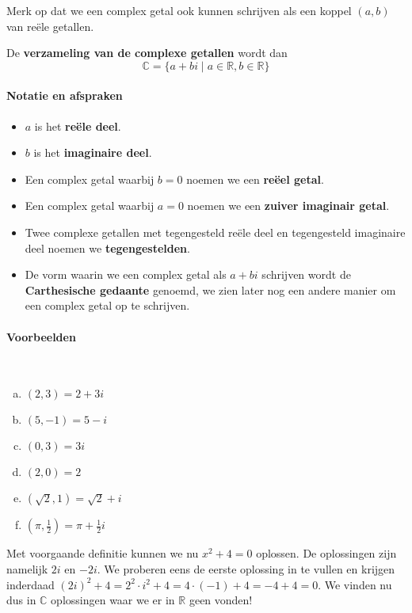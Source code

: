 \documentclass[12pt,twoside]{article}
\begin{document}
Merk op dat we een complex getal ook kunnen schrijven als een koppel $(a,b)$ van reële getallen.

De {\bf verzameling van de complexe getallen} wordt dan
$$\mathbb{C}=\{ a + bi \;|\; a\in\mathbb{R}, b\in\mathbb{R}\}$$

\paragraph*{Notatie en afspraken}
\begin{itemize}
  \item $a$ is het {\bf reële deel}.
  \item $b$ is het {\bf imaginaire deel}.
  \item Een complex getal waarbij $b=0$ noemen we een {\bf reëel getal}.
  \item Een complex getal waarbij $a=0$ noemen we een {\bf zuiver imaginair getal}.
  \item Twee complexe getallen met tegengesteld reële deel en tegengesteld imaginaire deel noemen we {\bf tegengestelden}.
  \item De vorm waarin we een complex getal als $a+bi$ schrijven wordt de {\bf Carthesische gedaante} genoemd, we zien later nog een andere manier om een complex getal op te schrijven.
\end{itemize}

\paragraph*{Voorbeelden}\mbox{}\\
\begin{multicols}{2}
\begin{enumerate}[(a)]
  \item $(2,3)=2+3i$
  \item $(5,-1)=5-i$
  \item $(0,3)=3i$
  \item $(2,0)=2$
  \item $(\sqrt{2},1)=\sqrt{2}+i$
  \item $(\pi, \frac{1}{2})=\pi+\frac{1}{2}i$
\end{enumerate}
\end{multicols}

Met voorgaande definitie kunnen we nu $x^2+4=0$ oplossen. De oplossingen zijn namelijk $2i$ en $-2i$. We proberen eens de eerste oplossing in te vullen en krijgen inderdaad $(2i)^2+4 = 2^2\cdot i^2 + 4 = 4\cdot(-1) + 4 = -4 + 4 = 0$. We vinden nu dus in $\mathbb{C}$ oplossingen waar we er in $\mathbb{R}$ geen vonden!
\end{document}
